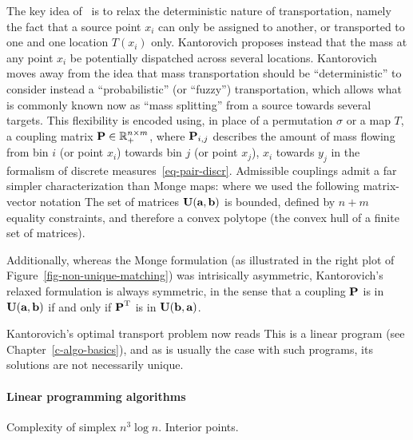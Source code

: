 The key idea of~\cite{Kantorovich42} is to relax the deterministic nature of transportation, namely the fact that a source point $x_i$ can only be assigned to another, or transported to one and one location $T(x_i)$ only. Kantorovich proposes instead that the mass at any point $x_i$ be potentially dispatched across several locations. Kantorovich moves away from the idea that mass transportation should be ``deterministic'' to consider instead a ``probabilistic'' (or ``fuzzy'') transportation, which allows what is commonly known now as ``mass splitting'' from a source towards several targets. This flexibility is encoded using, in place of a permutation $\sigma$ or a map $T$, a coupling matrix $\P  \in \RR_+^{n \times m}$, where $\P_{i,j}$ describes the amount of mass flowing from bin $i$ (or point $x_i$) towards bin $j$ (or point $x_j$), 
$x_i$ towards $y_j$ in the formalism of discrete measures~\eqref{eq-pair-discr}. Admissible couplings admit a far simpler characterization than Monge maps:
where we used the following matrix-vector notation
The set of matrices $\CouplingsD(\a,\b)$ is bounded, defined by $n+m$ equality constraints, and therefore a convex polytope (the convex hull of a finite set of matrices).

%
Additionally, whereas the Monge formulation (as illustrated in the right plot of Figure~\ref{fig-non-unique-matching}) was intrisically asymmetric, Kantorovich's relaxed formulation is always symmetric, in the sense that a coupling $\P$ is in  $\CouplingsD(\a,\b)$ if and only if  $\transp{\P}$ is in $\CouplingsD(\b,\a)$.

Kantorovich's optimal transport problem now reads
This is a linear program (see Chapter~\ref{c-algo-basics}), and as is usually the case with such programs, its solutions are not necessarily unique. 

\paragraph{Linear programming algorithms}

Complexity of simplex $n^3 \log n$.
Interior points.



